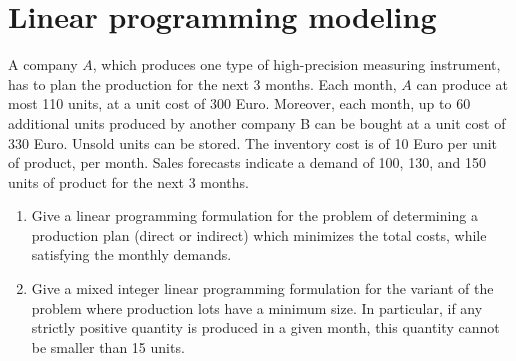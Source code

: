 \documentclass[12pt, a4paper]{report}
\newtheorem[style=M,bodystyle=\normalfont]{theorem}{Theorem}
\newtheorem[style=M,bodystyle=\normalfont]{corollary}{Corollary}
\newtheorem[style=M,bodystyle=\normalfont]{lemma}{Lemma}
\newtheorem[style=M,bodystyle=\normalfont]{definition}{Definition}
\begin{document}
    \newpage 

    \section{Linear programming modeling}
        A company $A$, which produces one type of high-precision measuring instrument, has to plan the production for the next 3 months. Each month, $A$ can produce at most 110 units, 
        at a unit cost of 300 Euro. Moreover, each month, up to 60 additional units produced by another company B can be bought at a unit cost of 330 Euro. Unsold units can be 
        stored. The inventory cost is of 10 Euro per unit of product, per month. Sales forecasts indicate a demand of 100, 130, and 150 units of product for the next 3 months.
        \begin{enumerate}
            \item Give a linear programming formulation for the problem of determining a production plan (direct or indirect) which minimizes the total costs, while satisfying 
                the monthly demands.
            \item Give a mixed integer linear programming formulation for the variant of the problem where production lots have a minimum size. In particular, if any strictly 
                positive quantity is produced in a given month, this quantity cannot be smaller than 15 units. 
        \end{enumerate}
\end{document}
